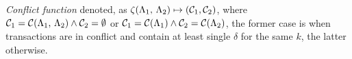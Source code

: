 \begin{definition}
\label{def:conflictFunction}
\emph{Conflict function} denoted, as $\zeta (\text{$\Lambda_1$, $\Lambda_2$}) \mapsto ( \mathcal{C}_1, \mathcal{C}_2)$, where $\mathcal{C}_1 = \mathcal{C}(\text{$\Lambda_1$, $\Lambda_2$}) \wedge \mathcal{C}_2 = \emptyset $ or $\mathcal{C}_1 = \mathcal{C}(\text{$\Lambda_1$}) \wedge \mathcal{C}_2=\mathcal{C}(\text{$\Lambda_2$})$, the former case is when transactions are in conflict and contain at least single $\delta$ for the same $k$, the latter otherwise.
\end{definition}
